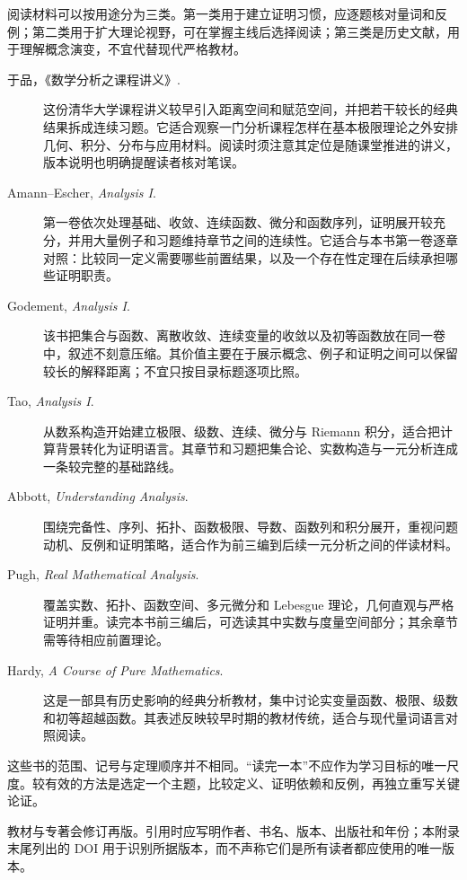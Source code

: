 阅读材料可以按用途分为三类。第一类用于建立证明习惯，应逐题核对量词和反例；第二类用于扩大理论视野，可在掌握主线后选择阅读；第三类是历史文献，用于理解概念演变，不宜代替现代严格教材。

\begin{description}
 \item[于品，《数学分析之课程讲义》.]
 这份清华大学课程讲义较早引入距离空间和赋范空间，并把若干较长的经典结果拆成连续习题。它适合观察一门分析课程怎样在基本极限理论之外安排几何、积分、分布与应用材料。阅读时须注意其定位是随课堂推进的讲义，版本说明也明确提醒读者核对笔误。
 \item[Amann--Escher, \emph{Analysis I}.]
 第一卷依次处理基础、收敛、连续函数、微分和函数序列，证明展开较充分，并用大量例子和习题维持章节之间的连续性。它适合与本书第一卷逐章对照：比较同一定义需要哪些前置结果，以及一个存在性定理在后续承担哪些证明职责。
 \item[Godement, \emph{Analysis I}.]
 该书把集合与函数、离散收敛、连续变量的收敛以及初等函数放在同一卷中，叙述不刻意压缩。其价值主要在于展示概念、例子和证明之间可以保留较长的解释距离；不宜只按目录标题逐项比照。
 \item[Tao, \emph{Analysis I}.] 从数系构造开始建立极限、级数、连续、微分与 Riemann 积分，适合把计算背景转化为证明语言。其章节和习题把集合论、实数构造与一元分析连成一条较完整的基础路线。
 \item[Abbott, \emph{Understanding Analysis}.] 围绕完备性、序列、拓扑、函数极限、导数、函数列和积分展开，重视问题动机、反例和证明策略，适合作为前三编到后续一元分析之间的伴读材料。
 \item[Pugh, \emph{Real Mathematical Analysis}.] 覆盖实数、拓扑、函数空间、多元微分和 Lebesgue 理论，几何直观与严格证明并重。读完本书前三编后，可选读其中实数与度量空间部分；其余章节需等待相应前置理论。
 \item[Hardy, \emph{A Course of Pure Mathematics}.] 这是一部具有历史影响的经典分析教材，集中讨论实变量函数、极限、级数和初等超越函数。其表述反映较早时期的教材传统，适合与现代量词语言对照阅读。
\end{description}

这些书的范围、记号与定理顺序并不相同。“读完一本”不应作为学习目标的唯一尺度。较有效的方法是选定一个主题，比较定义、证明依赖和反例，再独立重写关键论证。

\begin{remark}[版本说明]
教材与专著会修订再版。引用时应写明作者、书名、版本、出版社和年份；本附录末尾列出的 DOI 用于识别所据版本，而不声称它们是所有读者都应使用的唯一版本。
\end{remark}

